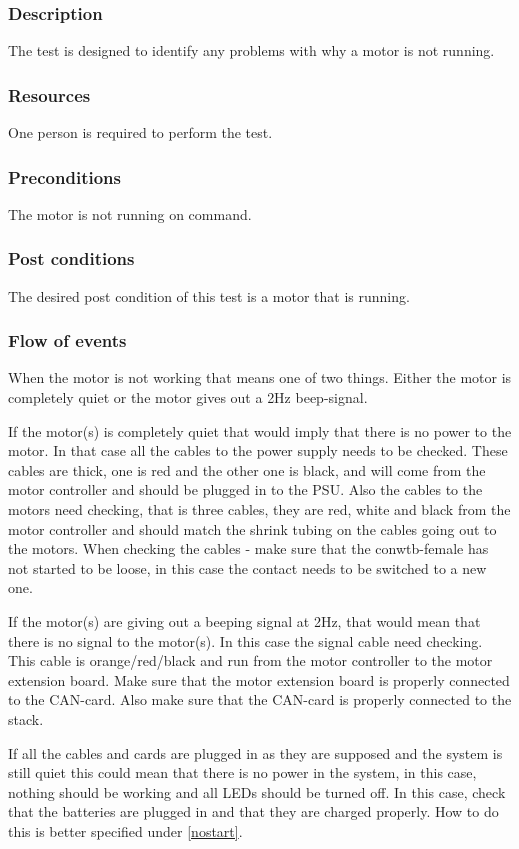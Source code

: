 \subsubsection*{Description}
The test is designed to identify any problems with why a motor is not running. 
\subsubsection*{Resources}
One person is required to perform the test. 
\subsubsection*{Preconditions}
The motor is not running on command.
\subsubsection*{Post conditions}
The desired post condition of this test is a motor that is running. 
\subsubsection*{Flow of events}
When the motor is not working that means one of two things. Either the motor is completely quiet or the motor gives out a 2Hz beep-signal. 

If the motor(s) is completely quiet that would imply that there is no power to the motor. In that case all the cables to the power supply needs to be checked. These cables are thick, one is red and the other one is black, and will come from the motor controller and should be plugged in to the PSU. Also the cables to the motors need checking, that is three cables, they are red, white and black from the motor controller and should match the shrink tubing on the cables going out to the motors. When checking the cables - make sure that the conwtb-female has not started to be loose, in this case the contact needs to be switched to a new one. 

If the motor(s) are giving out a beeping signal at 2Hz, that would mean that there is no signal to the motor(s). In this case the signal cable need checking. This cable is orange/red/black and run from the motor controller to the motor extension board. Make sure that the motor extension board is properly connected to the CAN-card. Also make sure that the CAN-card is properly connected to the stack.  

If all the cables and cards are plugged in as they are supposed and the system is still quiet this could mean that there is no power in the system, in this case, nothing should be working and all LEDs should be turned off. In this case, check that the batteries are plugged in and that they are charged properly. How to do this is better specified under \ref{nostart}.

